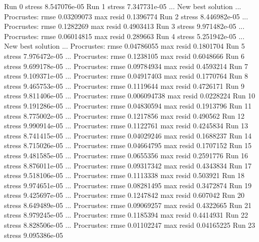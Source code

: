\documentclass[
]{book}
\newenvironment{Shaded}{\begin{snugshade}}{\end{snugshade}}
\newcommand{\NormalTok}[1]{#1}
\begin{document}
\begin{Shaded}
\begin{Highlighting}[]
\NormalTok{Run 0 stress 8.547076e{-}05 }
\NormalTok{Run 1 stress 7.347731e{-}05 }
\NormalTok{... New best solution}
\NormalTok{... Procrustes: rmse 0.03209073  max resid 0.1396774 }
\NormalTok{Run 2 stress 8.446982e{-}05 }
\NormalTok{... Procrustes: rmse 0.1282269  max resid 0.4903413 }
\NormalTok{Run 3 stress 9.971482e{-}05 }
\NormalTok{... Procrustes: rmse 0.06014815  max resid 0.289663 }
\NormalTok{Run 4 stress 5.251942e{-}05 }
\NormalTok{... New best solution}
\NormalTok{... Procrustes: rmse 0.04786055  max resid 0.1801704 }
\NormalTok{Run 5 stress 7.976472e{-}05 }
\NormalTok{... Procrustes: rmse 0.1238105  max resid 0.6048666 }
\NormalTok{Run 6 stress 9.699178e{-}05 }
\NormalTok{... Procrustes: rmse 0.09784934  max resid 0.4593214 }
\NormalTok{Run 7 stress 9.109371e{-}05 }
\NormalTok{... Procrustes: rmse 0.04917403  max resid 0.1770764 }
\NormalTok{Run 8 stress 9.465753e{-}05 }
\NormalTok{... Procrustes: rmse 0.1119644  max resid 0.4726171 }
\NormalTok{Run 9 stress 9.811406e{-}05 }
\NormalTok{... Procrustes: rmse 0.006094738  max resid 0.0228224 }
\NormalTok{Run 10 stress 9.191286e{-}05 }
\NormalTok{... Procrustes: rmse 0.04830594  max resid 0.1913796 }
\NormalTok{Run 11 stress 8.775002e{-}05 }
\NormalTok{... Procrustes: rmse 0.1217856  max resid 0.490562 }
\NormalTok{Run 12 stress 9.990914e{-}05 }
\NormalTok{... Procrustes: rmse 0.1122761  max resid 0.4245834 }
\NormalTok{Run 13 stress 8.741415e{-}05 }
\NormalTok{... Procrustes: rmse 0.04029246  max resid 0.1688237 }
\NormalTok{Run 14 stress 8.715026e{-}05 }
\NormalTok{... Procrustes: rmse 0.04664795  max resid 0.1707152 }
\NormalTok{Run 15 stress 9.481585e{-}05 }
\NormalTok{... Procrustes: rmse 0.0655356  max resid 0.2591776 }
\NormalTok{Run 16 stress 8.876011e{-}05 }
\NormalTok{... Procrustes: rmse 0.09317342  max resid 0.4343834 }
\NormalTok{Run 17 stress 9.518106e{-}05 }
\NormalTok{... Procrustes: rmse 0.1113338  max resid 0.503921 }
\NormalTok{Run 18 stress 9.974651e{-}05 }
\NormalTok{... Procrustes: rmse 0.08281495  max resid 0.3472874 }
\NormalTok{Run 19 stress 9.425697e{-}05 }
\NormalTok{... Procrustes: rmse 0.1247842  max resid 0.607042 }
\NormalTok{Run 20 stress 8.649489e{-}05 }
\NormalTok{... Procrustes: rmse 0.09069257  max resid 0.4322665 }
\NormalTok{Run 21 stress 8.979245e{-}05 }
\NormalTok{... Procrustes: rmse 0.1185394  max resid 0.4414931 }
\NormalTok{Run 22 stress 8.828506e{-}05 }
\NormalTok{... Procrustes: rmse 0.01102247  max resid 0.04165225 }
\NormalTok{Run 23 stress 9.095386e{-}05 }

\end{Highlighting}
\end{Shaded}
\end{document}
